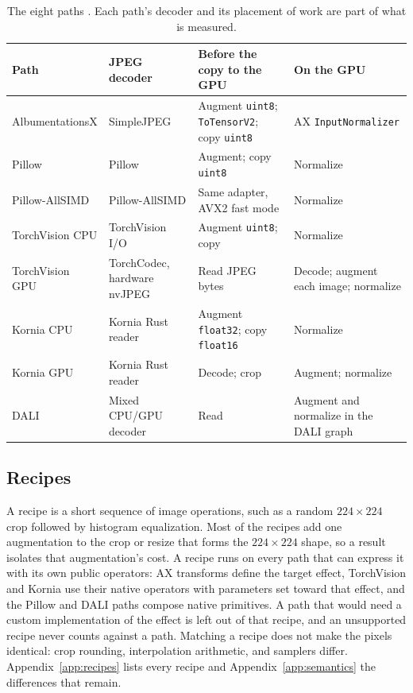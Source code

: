 \documentclass[11pt]{article}
\begin{document}
\begin{table}[H]
\centering\small
{}
\begin{tabularx}{\textwidth}{P{3.0cm}P{2.6cm}YY}
\textbf{Path} & \textbf{JPEG decoder} & \textbf{Before the copy to the GPU} & \textbf{On the GPU} \\ \midrule
AlbumentationsX & SimpleJPEG & Augment \texttt{uint8}; \texttt{ToTensorV2}; copy \texttt{uint8} & AX \texttt{InputNormalizer} \\
Pillow & Pillow & Augment; copy \texttt{uint8} & Normalize \\
Pillow-AllSIMD & Pillow-AllSIMD & Same adapter, AVX2 fast mode & Normalize \\
TorchVision CPU & TorchVision I/O & Augment \texttt{uint8}; copy & Normalize \\
TorchVision GPU & TorchCodec, hardware nvJPEG & Read JPEG bytes & Decode; augment each image; normalize \\
Kornia CPU & Kornia Rust reader & Augment \texttt{float32}; copy \texttt{float16} & Normalize \\
Kornia GPU & Kornia Rust reader & Decode; crop & Augment; normalize \\
DALI & Mixed CPU/GPU decoder & Read & Augment and normalize in the DALI graph \\
\end{tabularx}
\caption{The eight paths \cite{albumentationsx,pillow,allsimd,torchvision,torchcodec,kornia,dali}.
Each path's decoder and its placement of work are part of what is measured.}
\label{tab:paths}
\end{table}

\subsection{Recipes}

A recipe is a short sequence of image operations, such as a random \(224\times224\) crop followed
by histogram equalization. Most of the \RecipeCount{} recipes add one augmentation to the crop or resize that forms the
\(224\times224\) shape, so a result isolates that augmentation's cost. A recipe runs on every path that can express
it with its own public operators: AX transforms define the target effect, TorchVision and Kornia
use their native operators with parameters set toward that effect, and the Pillow and DALI paths
compose native primitives. A path that would need a custom implementation of the effect is left
out of that recipe, and an unsupported recipe never counts against a path. Matching a recipe does
not make the pixels identical: crop rounding, interpolation arithmetic, and samplers differ.
Appendix~\ref{app:recipes} lists every recipe and Appendix~\ref{app:semantics} the differences
that remain.
\end{document}
